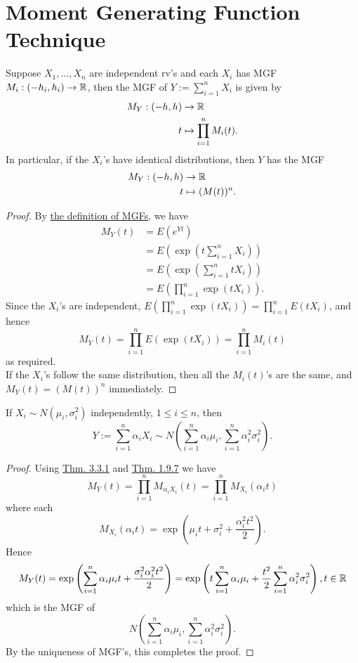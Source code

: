 \documentclass[11pt,fleqn]{book} %
\begin{document}

\section{Moment Generating Function Technique}

\begin{theorem} \label{thm:331}
Suppose \(X_1, \ldots, X_n\) are independent rv's and each \(X_i\) has MGF \(M_i: (-h_i, h_i)\rightarrow\mathbb{R}\), then the MGF of \(Y := \sum_{i=1}^n X_i\) is given by
\[
\begin{aligned}
M_Y: (-h, h) &\rightarrow \mathbb{R} \\
t &\mapsto \prod_{i=1}^n M_i(t).
\end{aligned}
\]
\indent In particular, if the \(X_i\)'s have identical distributions, then \(Y\) has the MGF
\[
\begin{aligned}
M_Y: (-h, h) &\rightarrow \mathbb{R} \\
t &\mapsto (M(t))^n.
\end{aligned}
\]
\end{theorem}
\begin{proof} By \hyperref[def:192]{the definition of MGFs}, we have
\[
\begin{aligned}
M_Y(t) &= E(e^{Yt}) \\
&= E\left(\exp\left(t\sum_{i=1}^n X_i\right)\right) \\
&= E\left(\exp\left(\sum_{i=1}^n tX_i\right)\right) \\
&= E\left(\prod_{i=1}^n \exp(tX_i)\right).
\end{aligned}
\]
\indent Since the \(X_i\)'s are independent, \(E\left(\prod_{i=1}^n \exp(tX_i)\right) = \prod_{i=1}^n E(tX_i)\), and hence
\[
M_Y(t) = \prod_{i=1}^n E(\exp(tX_i)) = \prod_{i=1}^n M_i(t)
\]
as required. \\
\indent If the \(X_i\)'s follow the same distribution, then all the \(M_i(t)\)'s are the same, and \(M_Y(t) = (M(t))^n\) immediately.
\end{proof}

\begin{theorem} \label{thm:332}
If \(X_i \sim N(\mu_i, \sigma_i^2)\) independently, \(1 \leq i \leq n\), then
\[
Y := \sum_{i=1}^n \alpha_iX_i \sim N\left(\sum_{i=1}^n \alpha_i\mu_i, \sum_{i=1}^n \alpha_i^2\sigma_i^2\right).
\]
\end{theorem}
\begin{proof} Using \hyperref[thm:331]{Thm. 3.3.1} and \hyperref[thm:197]{Thm. 1.9.7} we have
\[
M_Y(t) = \prod_{i=1}^n M_{\alpha_iX_i}(t) = \prod_{i=1}^n M_{X_i}(\alpha_i t)
\]
where each
\[
M_{X_i}(\alpha_i t) = \exp\left(\mu_i t + \sigma_i^2 + \frac{\alpha_i^2t^2}{2}\right).
\]
\indent Hence 
\[
M_Y(t) = \exp\left(\sum_{i=1}^n \alpha_i\mu_i t + \frac{\sigma_i^2\alpha_i^2 t^2}{2}\right) 
= \exp\left(t\sum_{i=1}^n \alpha_i\mu_i + \frac{t^2}{2} \sum_{i=1}^n \alpha_i^2\sigma_i^2\right), t \in \mathbb{R}
\]
which is the MGF of
\[
N\left(\sum_{i=1}^n \alpha_i\mu_i, \sum_{i=1}^n\alpha_i^2 \sigma_i^2\right).
\]
\indent By the uniqueness of MGF's, this completes the proof.
\end{proof}
\end{document}

